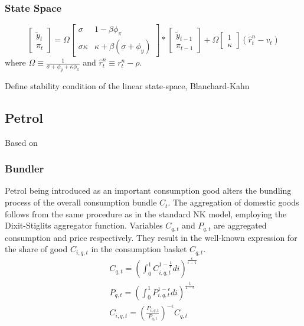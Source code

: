 \documentclass[12pt,a4paper,english]{article} %
\begin{document}
	\subsubsection{State Space}
	\begin{equation}
		\begin{bmatrix}
			\tilde{y}_t \\
			\pi_t
		\end{bmatrix}
		=
		\Omega
		\begin{bmatrix}
			\sigma & 1 - \beta \phi_{\pi} \\
			\sigma \kappa & \kappa + \beta (\sigma + \phi_y)
		\end{bmatrix}
		*
		\begin{bmatrix}
			\tilde{y}_{t-1} \\
			\pi_{t-1}
		\end{bmatrix}
		+
		\Omega
		\begin{bmatrix}
			1 \\
			\kappa
		\end{bmatrix}	
		(\hat{r}_t^n - v_t)
	\end{equation}
	where $\Omega \equiv \frac{1}{\sigma + \phi_y + \kappa \phi_{\pi}}$ and $\hat{r}_t^n \equiv r_t^n - \rho$.
	
	Define stability condition of the linear state-space, Blanchard-Kahn

	\subsection{Petrol}
	Based on 
	
	
	\subsubsection{Bundler}
	Petrol being introduced as an important consumption good alters the bundling process of the overall consumption bundle $C_t$. 
	The aggregation of domestic goods follows from the same procedure as in the standard NK model, employing the Dixit-Stiglits aggregator function. Variables $C_{q,t}$ and $P_{q,t}$ are aggregated consumption and price respectively. They result in the well-known expression for the share of good $C_{i,q,t}$ in the consumption basket $C_{q,t}$. \\
		\begin{equation}
		\begin{aligned}
			C_{q,t} = \left( \int_{0}^{1} C_{i,q,t}^{1 - \frac{1}{\epsilon}} di \right)^{\frac{\epsilon}{\epsilon-1}} \\
			P_{q,t} = \left( \int_{0}^{1} P_{i,q,t}^{1 - \epsilon} di \right)^{\frac{1}{1-\epsilon}} \\
			C_{i,q,t} = \left( \frac{P_{i,q,t}}{P_{q,t}} \right)^{-\epsilon} C_{q,t}
		\end{aligned}
	\end{equation}
	
\end{document}
